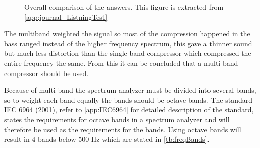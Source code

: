 \begin{figure}[H]
\centering
{}
\caption{Overall comparison of the answers. This figure is extracted from \autoref{app:journal_ListningTest}}
\label{fig:piechartsongsReport}
\end{figure}

The multiband weighted the signal so most of the compression happened in the bass ranged instead of the higher frequency spectrum, this gave a thinner sound but much less distortion than the single-band compressor which compressed the entire frequency the same. From this it can be concluded that a multi-band compressor should be used. 

Because of multi-band the spectrum analyzer must be divided into several bands, so to weight each band equally the bands should be octave bands. The standard IEC 6964 (2001), refer to \autoref{app:IEC6964} for detailed description of the standard, states the requirements for octave bands in a spectrum analyzer and will therefore be used as the requirements for the bands. Using octave bands will result in 4 bands below 500 Hz which are stated in \autoref{tb:freqBands}.

